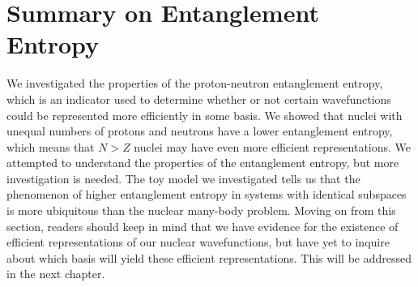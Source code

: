 \section{Summary on Entanglement Entropy}
We investigated the properties of the proton-neutron entanglement entropy,
which is an indicator used to determine whether or not certain wavefunctions
could be represented more efficiently in some basis. We showed that nuclei with
unequal numbers of protons and neutrons have a lower entanglement entropy, which
means that $N>Z$ nuclei may have even more efficient representations. We
attempted to understand the properties of the entanglement entropy, but more 
investigation is needed. The toy model we investigated tells us that the phenomenon
of higher entanglement entropy in systems with identical subspaces is more
ubiquitous than the nuclear many-body problem. Moving on from this section,
readers should keep in mind that we have evidence for the existence of 
efficient representations of our nuclear wavefunctions, but have yet to 
inquire about which basis will yield these efficient representations. This will
be addressed in the next chapter.






